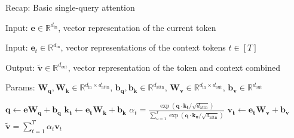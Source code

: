 \documentclass[12pt,aspectratio=169,handout]{beamer}
\begin{document}
\begin{frame}{Recap: Basic single-query attention}
	
	\begin{minipage}[t][10cm][t]{15cm}
		
		Input: $\bm{e} \in \mathbb{R}^{d_\text{in}}$, vector representation of the current token
		
		Input: $\bm{e}_t \in \mathbb{R}^{d_\text{in}}$, vector representations of the context tokens $t \in [T]$
		
		Output: $\bm{\tilde v} \in \mathbb{R}^{d_\text{out}}$, vector representation of the token and context combined
		
		Params: $\bm{W_q}, \bm{W_k} \in \mathbb{R}^{d_\text{in} \times d_\text{attn}}$, $\bm{b_q}, \bm{b_k} \in \mathbb{R}^{d_\text{attn}}$,
		$\bm{W_v} \in \mathbb{R}^{d_\text{in} \times d_\text{out}}$, $ \bm{b_v} \in \mathbb{R}^{d_\text{out}}$
		
		\begin{algorithmic}[1]
			\State $\bm{q} \gets \bm{e} \bm{W_q} + \bm{b_q}$
			\State $\bm{k_t} \gets \bm{e_t} \bm{W_k} + \bm{b_k}$
			\State $\alpha_{t} = \frac{
				\exp(\bm{q} \cdot \bm{k_t} / \sqrt{d_{\text{attn}}})
			}{
				\sum_{u = 1}^{T}\exp(\bm{q} \cdot \bm{k_u} / \sqrt{d_{\text{attn}}})
			}$
			\State $\bm{v_t} \gets \bm{e_t} \bm{W_v} + \bm{b_v}$
			\EndFor
			\State \Return $\bm{\tilde v} = \sum_{t=1}^T \alpha_t \bm{v}_t$
			\EndFunction
		\end{algorithmic}
		
	\end{minipage}
\end{frame}
\end{document}
